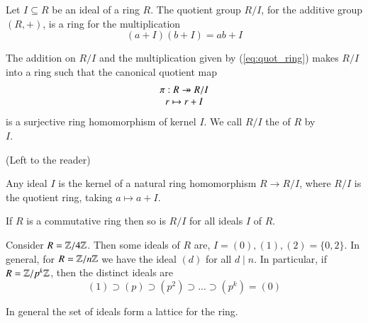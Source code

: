 \documentclass[12pt, a4paper, twoside, openright, titlepage]{book}
\begin{document}
\begin{defn}{}{}
    Let $I \subseteq R$ be an ideal of a ring $R$. The quotient group $R/I$, for the additive group $(R,+)$, is a ring for the multiplication \begin{equation}
        (a+I)(b+I) = ab+I \tag{$\star$}\label{eq:quot_ring}
    \end{equation}
\end{defn}

\begin{thm}{}{}
    The addition on $R/I$ and the multiplication given by (\ref{eq:quot_ring}) makes $R/I$ into a ring such that the canonical quotient map \begin{equation}
        \begin{array}{c} \pi: R \twoheadrightarrow R/I \\ r\mapsto r+I \end{array}
    \end{equation}
    is a surjective ring homomorphism of kernel $I$. We call $R/I$ the  of $R$ by \\$I$.
    \begin{proof*}{}{}
        (Left to the reader)
    \end{proof*}
\end{thm}

\begin{thm}{}{}
        Any ideal $I$ is the kernel of a natural ring homomorphism $R \rightarrow R/I$, where $R/I$ is the quotient ring, taking $a \mapsto a+I$. 
\end{thm}

\begin{rmk}{}{}
    If $R$ is a commutative ring then so is $R/I$ for all ideals $I$ of $R$.
\end{rmk}

\begin{eg}{}{}
        Consider $R = \mathbb Z/4\mathbb Z$. Then some ideals of $R$ are, $I = (0),(1),(2) = \{0,2\}$. In general, for $R = \mathbb Z/n\mathbb Z$ we have the ideal $(d)$ for all $d \;\vert\;n$. In particular, if $R = \mathbb Z/p^k\mathbb Z$, then the distinct ideals are $$(1)\supset(p)\supset(p^2)\supset...\supset(p^k)=(0)$$
\end{eg}


\begin{rmk}{}{}
        In general the set of ideals form a lattice for the ring.
\end{rmk}
\end{document}
